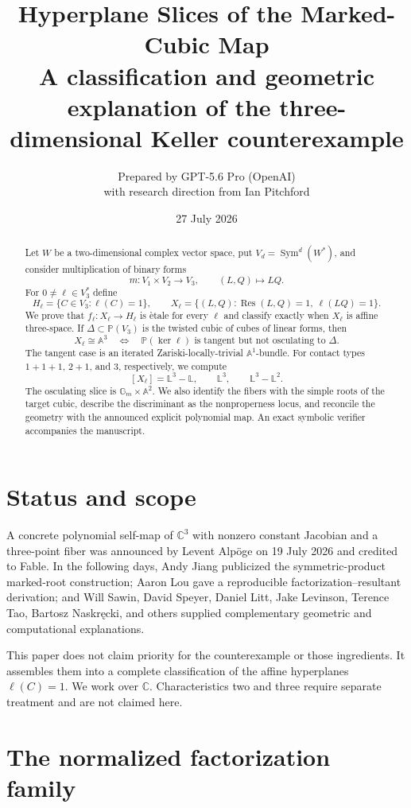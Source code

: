 \documentclass[11pt]{article}
\title{Hyperplane Slices of the Marked-Cubic Map\\
\large A classification and geometric explanation of the three-dimensional Keller counterexample}
\author{Prepared by GPT-5.6 Pro (OpenAI)\\
with research direction from Ian Pitchford}
\date{27 July 2026}
\newcommand{\A}{\mathbb A}
\newcommand{\C}{\mathbb C}
\newcommand{\Gm}{\mathbb G_m}
\newcommand{\Pj}{\mathbb P}
\newcommand{\Lef}{\mathbb L}
\newcommand{\Res}{\operatorname{Res}}
\newcommand{\Sym}{\operatorname{Sym}}
\theoremstyle{remark}
\begin{document}
\maketitle

\begin{abstract}
Let $W$ be a two-dimensional complex vector space, put
$V_d=\Sym^d(W^*)$, and consider multiplication of binary forms
\[
m:V_1\times V_2\longrightarrow V_3,\qquad (L,Q)\longmapsto LQ.
\]
For $0\ne\ell\in V_3^*$ define
\[
H_\ell=\{C\in V_3:\ell(C)=1\},\qquad
X_\ell=\{(L,Q):\Res(L,Q)=1,\ \ell(LQ)=1\}.
\]
We prove that $f_\ell:X_\ell\to H_\ell$ is \`etale for every $\ell$ and
classify exactly when $X_\ell$ is affine three-space. If
$\Delta\subset\Pj(V_3)$ is the twisted cubic of cubes of linear forms, then
\[
X_\ell\cong\A^3
\quad\Longleftrightarrow\quad
\Pj(\ker\ell)\text{ is tangent but not osculating to }\Delta.
\]
The tangent case is an iterated Zariski-locally-trivial $\A^1$-bundle. For
contact types $1+1+1$, $2+1$, and $3$, respectively, we compute
\[
[X_\ell]=\Lef^3-\Lef,\qquad \Lef^3,\qquad \Lef^3-\Lef^2.
\]
The osculating slice is $\Gm\times\A^2$. We also identify the fibers with the
simple roots of the target cubic, describe the discriminant as the
nonproperness locus, and reconcile the geometry with the announced explicit
polynomial map. An exact symbolic verifier accompanies the manuscript.
\end{abstract}

\section{Status and scope}

A concrete polynomial self-map of $\C^3$ with nonzero constant Jacobian and a
three-point fiber was announced by Levent Alp\"oge on 19 July 2026 and
credited to Fable. In the following days, Andy Jiang publicized the
symmetric-product marked-root construction; Aaron Lou gave a reproducible
factorization--resultant derivation; and Will Sawin, David Speyer, Daniel
Litt, Jake Levinson, Terence Tao, Bartosz Naskr\k{e}cki, and others supplied
complementary geometric and computational explanations.

This paper does not claim priority for the counterexample or those ingredients.
It assembles them into a complete classification of the affine hyperplanes
$\ell(C)=1$. We work over $\C$. Characteristics two and three require separate
treatment and are not claimed here.

\section{The normalized factorization family}
\end{document}
